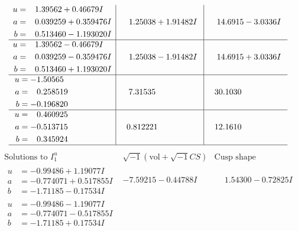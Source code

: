 \documentclass[1p]{elsarticle_modified}
\theoremstyle{definition}
\newcommand{\I}{\sqrt{-1}}
\begin{document}
$$\begin{array}{c|c|c}
\begin{aligned}
u &= \phantom{-}1.39562 + 0.46679 I \\
a &= \phantom{-}0.039259 + 0.359476 I \\
b &= \phantom{-}0.513460 - 1.193020 I\end{aligned}
 & \phantom{-}1.25038 + 1.91482 I & \phantom{-}14.6915 - 3.0336 I \\ \hline\begin{aligned}
u &= \phantom{-}1.39562 - 0.46679 I \\
a &= \phantom{-}0.039259 - 0.359476 I \\
b &= \phantom{-}0.513460 + 1.193020 I\end{aligned}
 & \phantom{-}1.25038 - 1.91482 I & \phantom{-}14.6915 + 3.0336 I \\ \hline\begin{aligned}
u &= -1.50565\phantom{ +0.000000I} \\
a &= \phantom{-}0.258519\phantom{ +0.000000I} \\
b &= -0.196820\phantom{ +0.000000I}\end{aligned}
 & \phantom{-}7.31535\phantom{ +0.000000I} & \phantom{-}30.1030\phantom{ +0.000000I} \\ \hline\begin{aligned}
u &= \phantom{-}0.460925\phantom{ +0.000000I} \\
a &= -0.513715\phantom{ +0.000000I} \\
b &= \phantom{-}0.345924\phantom{ +0.000000I}\end{aligned}
 & \phantom{-}0.812221\phantom{ +0.000000I} & \phantom{-}12.1610\phantom{ +0.000000I}\\
 \hline 
 \end{array}$$\newpage$$\begin{array}{c|c|c}  
\text{Solutions to }I^u_{1}& \I (\text{vol} + \sqrt{-1}CS) & \text{Cusp shape}\\
 \hline 
\begin{aligned}
u &= -0.99486 + 1.19077 I \\
a &= -0.774071 + 0.517855 I \\
b &= -1.71185 - 0.17534 I\end{aligned}
 & -7.59215 - 0.44788 I & \phantom{-}1.54300 - 0.72825 I \\ \hline\begin{aligned}
u &= -0.99486 - 1.19077 I \\
a &= -0.774071 - 0.517855 I \\
b &= -1.71185 + 0.17534 I\end{aligned}

\end{array}$$
\end{document}
